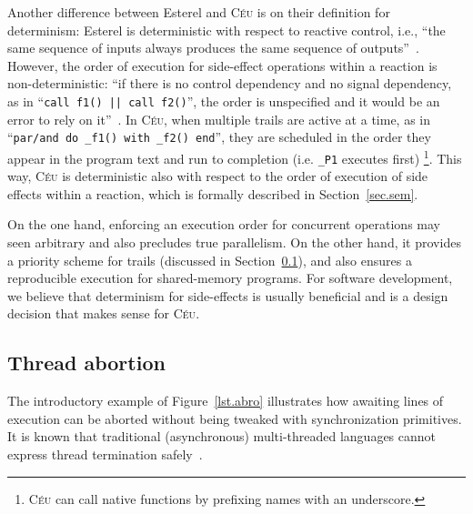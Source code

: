 \documentclass{acm_proc_article-sp}
\newcommand{\CEU}{\textsc{C\'{e}u}\xspace}
\newcommand{\code}[1] {{\small{\texttt{#1}}}}
\newcommand{\1}{\;}
\newcommand{\2}{\;\;}
\newcommand{\3}{\;\;\;}
\newcommand{\5}{\;\;\;\;\;}
\begin{document}
Another difference between Esterel and \CEU is on their definition for 
determinism:
%
Esterel is deterministic with respect to reactive control, i.e., ``the same 
sequence of inputs always produces the same sequence of 
outputs''~\cite{esterel.primer}.
However, the order of execution for side-effect operations within a reaction is 
non-deterministic: ``if there is no control dependency and no signal 
dependency, as in ``\code{call f1() || call f2()}'', the order is unspecified 
and it would be an error to rely on it''~\cite{esterel.primer}.
%
In \CEU, when multiple trails are active at a time, as in
``\code{par/and~do~\_f1()~with~\_f2()~end}'', they are scheduled in the order 
they appear in the program text and run to completion (i.e. \code{\_P1} 
executes first)%
\footnote{
\CEU can call native functions by prefixing names with an underscore.
}.
%
This way, \CEU is deterministic also with respect to the order of execution of 
side effects within a reaction, which is formally described in 
Section~\ref{sec.sem}.

On the one hand, enforcing an execution order for concurrent operations may 
seen arbitrary and also precludes true parallelism.
On the other hand, it provides a priority scheme for trails (discussed in 
Section~\ref{sec.ceu.abortion}), and also ensures a reproducible execution for 
shared-memory programs.
%
For software development, we believe that determinism for side-effects is 
usually beneficial and is a design decision that makes sense for \CEU.

\begin{comment}
For instance, in Esterel, ``if a variable is written by some thread, then it 
can neither be read nor be written by concurrent 
threads''~\cite{esterel.primer}.

However, in Esterel, \emph{if a variable is written by some thread, then it can 
neither be read nor be written by concurrent threads}~\cite{esterel.primer} 
\end{comment}

\subsection{Thread abortion}
\label{sec.ceu.abortion}

The introductory example of Figure~\ref{lst.abro} illustrates how awaiting 
lines of execution can be aborted without being tweaked with synchronization 
primitives.
It is known that traditional (asynchronous) multi-threaded languages cannot 
express thread termination 
safely~\cite{esterel.preemption,sync_async.threadsstop}.
\end{document}
